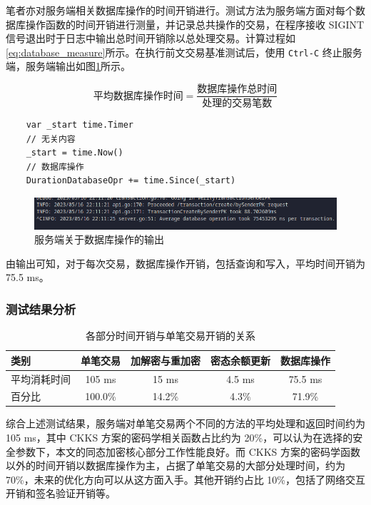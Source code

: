 笔者亦对服务端相关数据库操作的时间开销进行。测试方法为服务端方面对每个数据库操作函数的时间开销进行测量，并记录总共操作的交易，在程序接收 SIGINT 信号退出时于日志中输出总时间开销除以总处理交易。计算过程如\eqref{eq:database_measure}所示。在执行前文交易基准测试后，使用 \texttt{Ctrl-C} 终止服务端，服务端输出如图\ref{Fig:bench_database_perf}所示。

\begin{equation} \label{eq:database_measure}
    \textrm{平均数据库操作时间} = \frac{\textrm{数据库操作总时间}}{\textrm{处理的交易笔数}}
\end{equation}

\begin{verbatim}
    var _start time.Timer
    // 无关内容
    _start = time.Now()
    // 数据库操作
    DurationDatabaseOpr += time.Since(_start)
\end{verbatim}

\begin{figure}[h]
    \centering
    \includegraphics[width=0.8\linewidth]{./Figures/Test_Database_Perf.png}
    \caption{服务端关于数据库操作的输出} \label{Fig:bench_database_perf}
\end{figure}

由输出可知，对于每次交易，数据库操作开销，包括查询和写入，平均时间开销为 75.5 ms。

\subsubsection{测试结果分析}

\begin{table}[h]
    \begin{tabular}{|l|c|c|c|c|}
        \hline
        类别 & 单笔交易 & 加解密与重加密 & 密态余额更新 & 数据库操作 \\
        \hline
        平均消耗时间 & 105 ms & 15 ms & 4.5 ms & 75.5 ms \\ 
        \hline
        百分比 & 100.0\% & 14.2\% & 4.3\% & 71.9\% \\
        \hline
    \end{tabular}
    \caption{各部分时间开销与单笔交易开销的关系} \label{Tab:time_comsumption}
\end{table}

综合上述测试结果，服务端对单笔交易两个不同的方法的平均处理和返回时间约为 105 ms，其中 CKKS 方案的密码学相关函数占比约为 20\%，可以认为在选择的安全参数下，本文的同态加密核心部分工作性能良好。而 CKKS 方案的密码学函数以外的时间开销以数据库操作为主，占据了单笔交易的大部分处理时间，约为 70\%，未来的优化方向可以从这方面入手。其他开销约占比 10\%，包括了网络交互开销和签名验证开销等。

